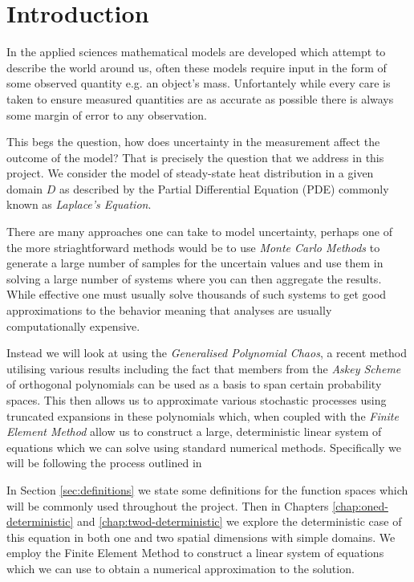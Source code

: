 \chapter{Introduction}

In the applied sciences mathematical models are developed which attempt to
describe the world around us, often these models require input in the form of
some observed quantity e.g. an object's mass. Unfortantely while every care is
taken to ensure measured quantities are as accurate as possible there is always
some margin of error to any observation.

This begs the question, how does uncertainty in the measurement affect the
outcome of the model? That is precisely the question that we address in this
project. We consider the model of steady-state heat distribution in a given
domain $D$ as described by the Partial Differential Equation (PDE) commonly
known as \textit{Laplace's Equation}.

There are many approaches one can take to model uncertainty, perhaps one of the
more striaghtforward methods would be to use \textit{Monte Carlo Methods} to
generate a large number of samples for the uncertain values and use them in
solving a large number of systems where you can then aggregate the results.
While effective one must usually solve thousands of such systems to get good
approximations to the behavior meaning that analyses are usually
computationally expensive.

Instead we will look at using the \textit{Generalised Polynomial Chaos}, a
recent method utilising various results including the fact that members from
the \textit{Askey Scheme} of orthogonal polynomials can be used as a basis to
span certain probability spaces. This then allows us to approximate various
stochastic processes using truncated expansions in these polynomials which,
when coupled with the \textit{Finite Element Method} allow us to construct a
large, deterministic linear system of equations which we can solve using
standard numerical methods.  Specifically we will be following the process
outlined in \cite{general-poly-chaos}

In Section \ref{sec:definitions} we state some definitions for the function
spaces which will be commonly used throughout the project. Then in Chapters
\ref{chap:oned-deterministic} and \ref{chap:twod-deterministic} we explore the
deterministic case of this equation in both one and two spatial dimensions
with simple domains. We employ the Finite Element Method to construct a linear
system of equations which we can use to obtain a numerical approximation to the
solution.

